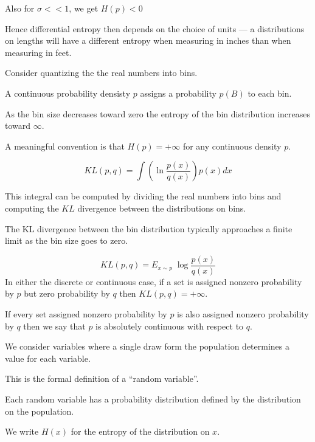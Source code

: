 {\vfill
Also for $\sigma << 1$, we get $H(p) < 0$

\vfill
Hence differential entropy then depends on the choice of units --- a distributions on lengths will have a different entropy
when measuring in inches than when measuring in feet.


Consider quantizing the the real numbers into bins.

\vfill
A continuous probability densisty $p$ assigns a probability $p(B)$ to each bin.

\vfill
As the bin size decreases toward zero the entropy of the bin distribution increases toward $\infty$.

\vfill
A meaningful convention is that $H(p) = +\infty$ for any continuous density $p$.


$$KL(p,q) = \int \left( \ln \frac{p(x)}{q(x)}\right) p(x) dx$$

\vfill
This integral can be computed by dividing the real numbers into bins and computing the $KL$ divergence between the distributions on bins.

\vfill
The KL divergence between the bin distribution typically approaches a finite limit as the bin size goes to zero.


$$KL(p,q) = E_{x \sim p}\; \log\frac{p(x)}{q(x)}$$
\vfill
In either the discrete or continuous case, if a set is assigned nonzero probability by $p$ but zero probability by $q$ then $KL(p,q) = +\infty$.

\vfill
If every set assigned nonzero probability by $p$ is also assigned nonzero probability by $q$ then we say that $p$ is absolutely continuous with respect to $q$.


We consider variables where a single draw form the population determines a value for each variable.

\vfill
This is the formal definition of a ``random variable''.

\vfill
Each random variable has a probability distribution defined by the distribution on the population.

\vfill
We write $H(x)$ for the entropy of the distribution on $x$.


}
